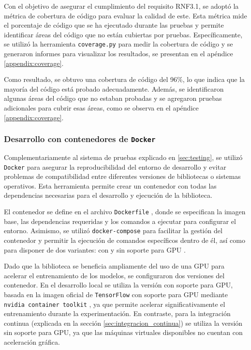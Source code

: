 Con el objetivo de asegurar el cumplimiento del requisito RNF3.1, se adoptó la métrica de cobertura de código \cite{pressman2014software} para evaluar la calidad de este. Esta métrica mide el porcentaje de código que se ha ejecutado durante las pruebas y permite identificar áreas del código que no están cubiertas por pruebas. Específicamente, se utilizó la herramienta \texttt{coverage.py} \cite{coveragepy} para medir la cobertura de código y se generaron informes para visualizar los resultados, se presentan en el apéndice \ref{appendix:coverage}.

Como resultado, se obtuvo una cobertura de código del 96\%, lo que indica que la mayoría del código está probado adecuadamente. Además, se identificaron algunas áreas del código que no estaban probadas y se agregaron pruebas adicionales para cubrir esas áreas, como se observa en el apéndice \ref{appendix:coverage}.

\subsubsection{Desarrollo con contenedores de \texttt{Docker}}
Complementariamente al sistema de pruebas explicado en \ref{sec:testing}, se utilizó \texttt{Docker} \cite{docker} para asegurar la reproducibilidad del entorno de desarrollo y evitar problemas de compatibilidad entre diferentes versiones de bibliotecas o sistemas operativos. Esta herramienta permite crear un contenedor con todas las dependencias necesarias para el desarrollo y ejecución de la biblioteca.

El contenedor se define en el archivo \texttt{Dockerfile} \cite{qtensor_dockerfile}, donde se especifican la imagen base, las dependencias requeridas y los comandos a ejecutar para configurar el entorno. Asimismo, se utilizó \texttt{docker-compose} \cite{docker_compose} para facilitar la gestión del contenedor y permitir la ejecución de comandos específicos dentro de él, así como para disponer de dos variantes: con y sin soporte para GPU \cite{qtensor_docker_compose_file}.

Dado que la biblioteca se beneficia ampliamente del uso de una GPU para acelerar el entrenamiento de los modelos, se configuraron dos versiones del contenedor. En el desarrollo local se utiliza la versión con soporte para GPU, basada en la imagen oficial de \texttt{TensorFlow} con soporte para GPU mediante \texttt{nvidia container toolkit} \cite{nvidia_container_toolkit}, ya que permite acelerar significativamente el entrenamiento durante la experimentación. En contraste, para la integración continua (explicada en la sección \ref{sec:integracion_continua}) se utiliza la versión sin soporte para GPU, ya que las máquinas virtuales disponibles no cuentan con aceleración gráfica.

